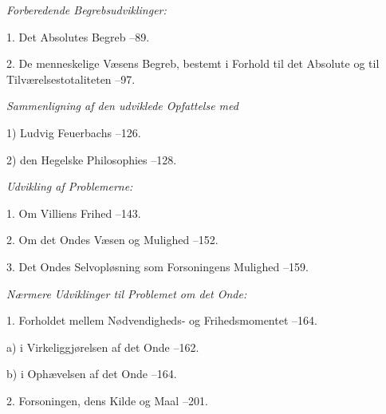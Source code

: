 \begin{list}{}{%
  \setlength{\leftmargin}{2.2em}\setlength{\itemindent}{-2.2em}%
  \setlength{\itemsep}{2pt}\setlength{\parsep}{0pt}}
\item[] \hspace{1.2em} \emph{Forberedende Begrebsudviklinger:}
\item[] \hspace{1.2em} 1. Det Absolutes Begreb --89.
\item[] \hspace{1.2em} 2. De menneskelige Væsens Begreb, bestemt i
  Forhold til det Absolute og til Tilværelsestotaliteten --97.
\item[] \hspace{1.2em} \emph{Sammenligning af den udviklede Opfattelse med}
\item[] \hspace{1.2em} 1) Ludvig Feuerbachs --126.
\item[] \hspace{1.2em} 2) den Hegelske Philosophies --128.
\item[] \hspace{1.2em} \emph{Udvikling af Problemerne:}
\item[] \hspace{1.2em} 1. Om Villiens Frihed --143.
\item[] \hspace{1.2em} 2. Om det Ondes Væsen og Mulighed --152.
\item[] \hspace{1.2em} 3. Det Ondes Selvopløsning som Forsoningens
  Mulighed --159.
\item[] \hspace{1.2em} \emph{Nærmere Udviklinger til Problemet om det Onde:}
\item[] \hspace{1.2em} 1. Forholdet mellem Nødvendigheds- og
  Frihedsmomentet --164.
\item[] \hspace{2.4em} a) i Virkeliggjørelsen af det Onde --162.
\item[] \hspace{2.4em} b) i Ophævelsen af det Onde --164.
\item[] \hspace{1.2em} 2. Forsoningen, dens Kilde og Maal --201.

\end{list}
